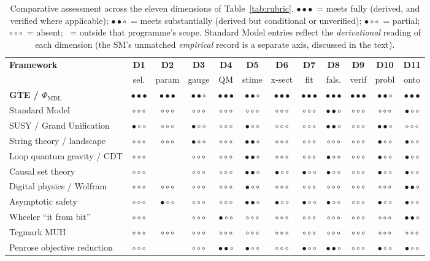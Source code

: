 \documentclass[11pt]{article}
\newcommand{\PHIMDL}{\ensuremath{\Phi_{\mathrm{MDL}}}}
\newcommand{\rFull}{\ensuremath{\bullet\bullet\bullet}}      %
\newcommand{\rStrong}{\ensuremath{\bullet\bullet\circ}}      %
\newcommand{\rPart}{\ensuremath{\bullet\circ\circ}}          %
\newcommand{\rNone}{\ensuremath{\circ\circ\circ}}            %
\newcommand{\rNA}{\textendash}                              %
\begin{document}
\begin{table}
\centering
\caption{Comparative assessment across the eleven dimensions of
Table~\ref{tab:rubric}.
\rFull{}~= meets fully (derived, and verified where applicable);
\rStrong{}~= meets substantially (derived but conditional or unverified);
\rPart{}~= partial;
\rNone{}~= absent;
\rNA{}~= outside that programme's scope.
Standard Model entries reflect the \emph{derivational} reading of each dimension
(the SM's unmatched \emph{empirical} record is a separate axis, discussed in the
text).}
\label{tab:matrix}
\small\renewcommand{\arraystretch}{1.35}\setlength{\tabcolsep}{4pt}
\begin{tabular}{@{}p{4.6cm}ccccccccccc@{}}
\toprule
\textbf{Framework} & \textbf{D1} & \textbf{D2} & \textbf{D3} & \textbf{D4} &
  \textbf{D5} & \textbf{D6} & \textbf{D7} & \textbf{D8} & \textbf{D9} &
  \textbf{D10} & \textbf{D11} \\
 & {\scriptsize sel.} & {\scriptsize param} & {\scriptsize gauge} &
  {\scriptsize QM} & {\scriptsize stime} & {\scriptsize x-sect} &
  {\scriptsize fit} & {\scriptsize fals.} & {\scriptsize verif} &
  {\scriptsize probl} & {\scriptsize onto} \\
\midrule
\textbf{GTE / $\PHIMDL$} &
  \rFull & \rFull & \rStrong & \rFull & \rStrong & \rFull & \rFull & \rFull &
  \rFull & \rStrong & \rFull \\
Standard Model &
  \rNone & \rNone & \rNone & \rNone & \rNone & \rNone & \rNone & \rStrong &
  \rNone & \rNone & \rPart \\
SUSY / Grand Unification &
  \rPart & \rNone & \rPart & \rNone & \rPart & \rNone & \rNone & \rStrong &
  \rNone & \rStrong & \rNone \\
String theory / landscape &
  \rNone & \rNone & \rPart & \rNone & \rStrong & \rNone & \rNone & \rNone &
  \rNone & \rPart & \rPart \\
Loop quantum gravity / CDT &
  \rNone & \rNA & \rNone & \rNone & \rStrong & \rNone & \rNone & \rPart &
  \rNone & \rPart & \rPart \\
Causal set theory &
  \rNone & \rNA & \rNone & \rNone & \rStrong & \rPart & \rPart & \rPart &
  \rNone & \rPart & \rPart \\
Digital physics / Wolfram &
  \rNone & \rNone & \rNone & \rNone & \rPart & \rNone & \rNone & \rNone &
  \rNone & \rNone & \rStrong \\
Asymptotic safety &
  \rNone & \rPart & \rNone & \rNone & \rStrong & \rPart & \rPart & \rPart &
  \rNone & \rPart & \rPart \\
Wheeler ``it from bit'' &
  \rNone & \rNA & \rNone & \rPart & \rNone & \rNone & \rNone & \rNone &
  \rNone & \rNone & \rStrong \\
Tegmark MUH &
  \rNone & \rNone & \rNone & \rNone & \rNone & \rNone & \rNone & \rNone &
  \rNone & \rNone & \rNone \\
Penrose objective reduction &
  \rNone & \rNA & \rNone & \rStrong & \rPart & \rNone & \rPart & \rStrong &
  \rNone & \rPart & \rPart \\
\bottomrule
\end{tabular}
\end{table}
\end{document}
